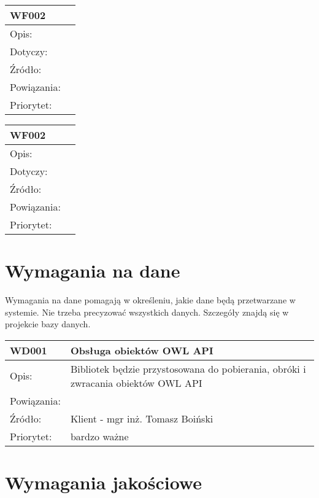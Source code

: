 \documentclass[a4paper,10pt]{article}
\begin{document}
\begin{tabular}{|l|l|} \hline

WF002 &  \\ \hline
Opis: &     \\ \hline
Dotyczy: &  \\ \hline
Źródło: &  \\ \hline
Powiązania: & \\ \hline
Priorytet: &  \\ \hline

\end{tabular}

\begin{tabular}{|l|l|} \hline

WF002 &  \\ \hline
Opis: &     \\ \hline
Dotyczy: &  \\ \hline
Źródło: &  \\ \hline
Powiązania: & \\ \hline
Priorytet: &  \\ \hline

\end{tabular}


\section{Wymagania na dane}

Wymagania na dane pomagają w określeniu, jakie dane będą przetwarzane w systemie. Nie trzeba precyzować wszystkich danych. Szczegóły znajdą się w projekcie bazy danych.

\begin{center}
\begin{tabular}{|l|l|} \hline

WD001 & Obsługa obiektów OWL API \\ \hline
Opis: & Bibliotek będzie przystosowana do pobierania, obróki i zwracania obiektów OWL API \\ \hline
Powiązania: &  \\ \hline
Źródło: & Klient - mgr inż. Tomasz Boiński  \\ \hline
Priorytet: &  bardzo ważne \\ \hline

\end{tabular}
\end{center}

\section{Wymagania jakościowe}
\end{document}
